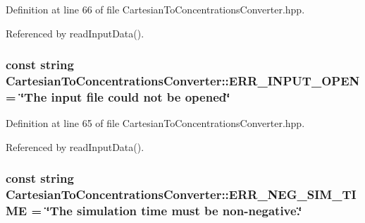 \-Definition at line 66 of file \-Cartesian\-To\-Concentrations\-Converter.\-hpp.



\-Referenced by read\-Input\-Data().

\hypertarget{classmultiscale_1_1video_1_1CartesianToConcentrationsConverter_a0ed0c4079a6eb5191409a3c670cdeb04}{
\subsubsection[{\-E\-R\-R\-\_\-\-I\-N\-P\-U\-T\-\_\-\-O\-P\-E\-N}]{\setlength{\rightskip}{0pt plus 5cm}const string {\bf \-Cartesian\-To\-Concentrations\-Converter\-::\-E\-R\-R\-\_\-\-I\-N\-P\-U\-T\-\_\-\-O\-P\-E\-N} = \char`\"{}\-The input file could not be opened\char`\"{}}}\label{classmultiscale_1_1video_1_1CartesianToConcentrationsConverter_a0ed0c4079a6eb5191409a3c670cdeb04}


\-Definition at line 65 of file \-Cartesian\-To\-Concentrations\-Converter.\-hpp.



\-Referenced by read\-Input\-Data().

\hypertarget{classmultiscale_1_1video_1_1CartesianToConcentrationsConverter_a2ea1d3a8c2f604f5f5b7abc4f8529302}{
\subsubsection[{\-E\-R\-R\-\_\-\-N\-E\-G\-\_\-\-S\-I\-M\-\_\-\-T\-I\-M\-E}]{\setlength{\rightskip}{0pt plus 5cm}const string {\bf \-Cartesian\-To\-Concentrations\-Converter\-::\-E\-R\-R\-\_\-\-N\-E\-G\-\_\-\-S\-I\-M\-\_\-\-T\-I\-M\-E} = \char`\"{}\-The simulation time must be non-\/negative.\char`\"{}}}\label{classmultiscale_1_1video_1_1CartesianToConcentrationsConverter_a2ea1d3a8c2f604f5f5b7abc4f8529302}


